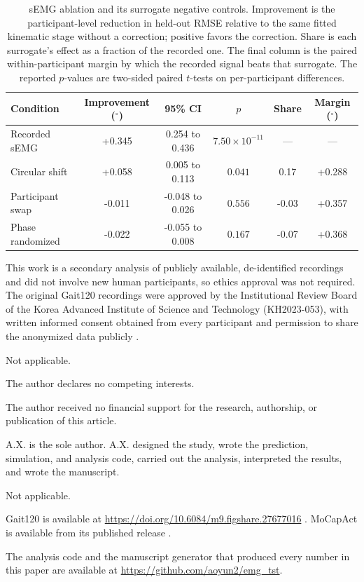 \documentclass[referee,lineno,pdflatex,sn-vancouver-num]{sn-jnl}
\begin{document}
\backmatter

\begin{table}[!htbp]
\caption{sEMG ablation and its surrogate negative controls. Improvement is the
participant-level reduction in held-out RMSE relative to the same fitted kinematic
stage without a correction; positive favors the correction. Share is each
surrogate's effect as a fraction of the recorded one. The final column is the
paired within-participant margin by which the recorded signal beats that
surrogate. The reported $p$-values are two-sided paired $t$-tests on per-participant
differences.}\label{tab:controls}
\setlength{\tabcolsep}{2.5pt}
\begin{tabular}{lccccc}
\toprule
Condition & Improvement ($^{\circ}$) & 95\% CI & $p$ & Share & Margin ($^{\circ}$) \\
\midrule
Recorded sEMG & +0.345 & 0.254 to 0.436 & $7.50\times10^{-11}$ & --- & --- \\
Circular shift & +0.058 & 0.005 to 0.113 & $0.041$ & 0.17 & +0.288 \\
Participant swap & -0.011 & -0.048 to 0.026 & $0.556$ & -0.03 & +0.357 \\
Phase randomized & -0.022 & -0.055 to 0.008 & $0.167$ & -0.07 & +0.368 \\
\bottomrule
\end{tabular}
\end{table}

This work is a secondary analysis of publicly available, de-identified
recordings and did not involve new human participants, so ethics approval was
not required. The original Gait120 recordings were approved by the
Institutional Review Board of the Korea Advanced Institute of Science and
Technology (KH2023-053), with written informed consent obtained from every
participant and permission to share the anonymized data publicly
\cite{boo2025}.

Not applicable.

The author declares no competing interests.

The author received no financial support for the research, authorship, or
publication of this article.

A.X. is the sole author. A.X. designed the study, wrote the prediction,
simulation, and analysis code, carried out the analysis, interpreted the
results, and wrote the manuscript.

Not applicable.

Gait120 is available at \url{https://doi.org/10.6084/m9.figshare.27677016}
\cite{boo2025dataset}. MoCapAct is available from its published release
\cite{wagener2022}.

The analysis code and the manuscript generator that produced every number in this
paper are available at \url{https://github.com/aoyun2/emg_tst}.


\end{document}
